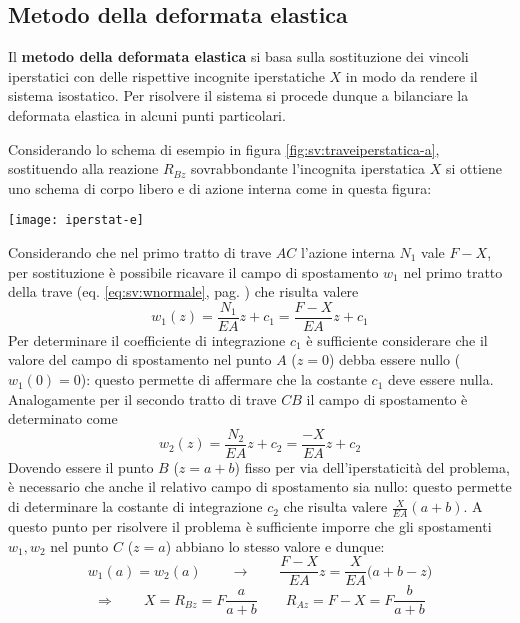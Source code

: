 	\subsection{Metodo della deformata elastica}		
		\begin{concetto}
			Il \textbf{metodo della deformata elastica} si basa sulla sostituzione dei vincoli iperstatici con delle rispettive incognite iperstatiche $X$ in modo da rendere il sistema isostatico. Per risolvere il sistema si procede dunque a bilanciare la deformata elastica in alcuni punti particolari.
		\end{concetto}
		Considerando lo schema di esempio in figura \ref{fig:sv:traveiperstatica-a}, sostituendo alla reazione $R_{Bz}$ sovrabbondante l'incognita iperstatica $X$ si ottiene uno schema di corpo libero e di azione interna come in questa figura:
		\begin{center}
			\texttt{[image: iperstat-e]}
		\end{center}
		Considerando che nel primo tratto di trave $AC$ l'azione interna $N_1$ vale $F-X$, per sostituzione è possibile ricavare il campo di spostamento $w_1$ nel primo tratto della trave (eq. \ref{eq:sv:wnormale}, pag. \pageref{eq:sv:wnormale}) che risulta valere
		\[ w_1(z) = \frac {N_1}{EA}z + c_1 = \frac{F-X}{EA}z  + c_1 \]
		Per determinare il coefficiente di integrazione $c_1$ è sufficiente considerare che il valore del campo di spostamento nel punto $A$ ($z=0$) debba essere nullo ($w_1(0)=0$): questo permette di affermare che la costante $c_1$ deve essere nulla. Analogamente per il secondo tratto di trave $CB$ il campo di spostamento è determinato come
		\[ w_2(z) = \frac{N_2}{EA}z +c_2  = \frac{-X}{EA}z +c_2  \]
		Dovendo essere il punto $B$ ($z=a+b$) fisso per via dell'iperstaticità del problema, è necessario che anche il relativo campo di spostamento sia nullo: questo permette di determinare la costante di integrazione $c_2$ che risulta valere $\frac{X}{EA}(a+b)$. A questo punto per risolvere il problema è sufficiente imporre che gli spostamenti $w_1,w_2$ nel punto $C$ ($z=a$) abbiano lo stesso valore e dunque:
		\[ w_1(a) = w_2(a)  \qquad \rightarrow \qquad \frac{F-X}{EA} z = \frac{X}{EA} \big(a+b-z\big) \]
		\[ \Rightarrow \qquad X = R_{Bz} = F \frac a {a+b} \qquad R_{Az} = F-X = F \frac b {a+b} \]
		
